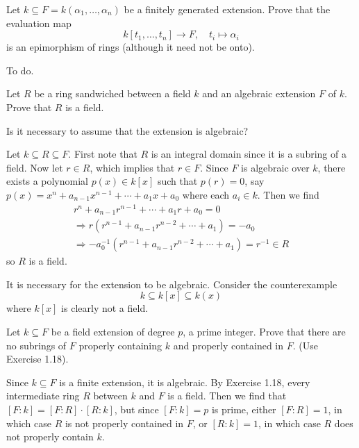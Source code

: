 \documentclass[../../master.tex]{subfiles}
\begin{document}
\begin{problem}
    Let $k \subseteq F = k(\alpha_1, \ldots, \alpha_n)$ be a finitely generated extension.
    Prove that the evaluation map
    \[
        k[t_1, \ldots, t_n] \to F, \quad t_i \mapsto \alpha_i
    \]
    is an epimorphism of rings (although it need not be onto).
\end{problem}

\begin{solution}
    To do.
\end{solution}

\begin{problem}
    Let $R$ be a ring sandwiched between a field $k$ and an algebraic extension $F$ of $k$.
    Prove that $R$ is a field.

    Is it necessary to assume that the extension is algebraic?
\end{problem}

\begin{solution}
    Let $k \subseteq R \subseteq F$.
    First note that $R$ is an integral domain since it is a subring of a field.
    Now let $r \in R$, which implies that $r \in F$.
    Since $F$ is algebraic over $k$, there exists a polynomial $p(x) \in k[x]$ such that $p(r) = 0$, say $p(x) = x^{n} + a_{n-1}x^{n-1} + \cdots + a_1 x + a_0$ where each $a_i \in k$.
    Then we find
    \begin{gather*}
        r^{n} + a_{n-1} r^{n-1} + \cdots + a_1 r + a_0 = 0 \\
        \Longrightarrow r(r^{n-1} + a_{n-1}r^{n-2} + \cdots + a_1) = -a_0 \\
        \Longrightarrow -a_0^{-1} (r^{n-1} + a_{n-1}r^{n-2} + \cdots + a_1) = r^{-1} \in R
    \end{gather*}
    so $R$ is a field.

    It is necessary for the extension to be algebraic.
    Consider the counterexample
    \[
        k \subseteq k[x] \subseteq k(x)
    \]
    where $k[x]$ is clearly not a field.
\end{solution}

\begin{problem}
    Let $k \subseteq F$ be a field extension of degree $p$, a prime integer.
    Prove that there are no subrings of $F$ properly containing $k$ and properly contained in $F$.
    (Use Exercise 1.18).
\end{problem}

\begin{solution}
    Since $k \subseteq F$ is a finite extension, it is algebraic.
    By Exercise 1.18, every intermediate ring $R$ between $k$ and $F$ is a field.
    Then we find that $[F : k] = [F : R] \cdot [R : k]$, but since $[F : k] = p$ is prime, either $[F : R] = 1$, in which case $R$ is not properly contained in $F$, or $[R : k] = 1$, in which case $R$ does not properly contain $k$.
\end{solution}
\end{document}
